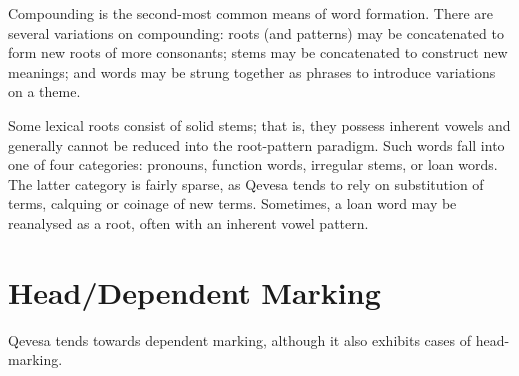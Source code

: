 \documentclass[grammar]{subfiles}
\begin{document}
  Compounding is the second-most common means of word formation.  There are
  several variations on compounding: roots (and patterns) may be concatenated
  to form new roots of more consonants; stems may be concatenated to construct
  new meanings; and words may be strung together as phrases to introduce
  variations on a theme.

  Some lexical roots consist of solid stems; that is, they possess inherent
  vowels and generally cannot be reduced into the root-pattern paradigm.  Such
  words fall into one of four categories: pronouns, function words, irregular
  stems, or loan words.  The latter category is fairly sparse, as Qevesa tends
  to rely on substitution of terms, calquing or coinage of new terms.
  Sometimes, a loan word may be reanalysed as a root, often with an inherent
  vowel pattern.

  \section{Head/Dependent Marking}
  \label{sec:mt_head_dependent_marking}

  Qevesa tends towards dependent marking, although it also exhibits cases of head-marking.

  \ToBeWritten





\end{document}
